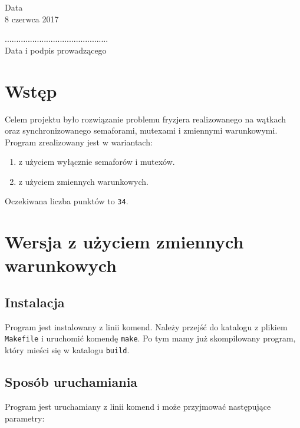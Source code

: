 \documentclass[12pt,a4paper]{article}
\newcommand{\datazajec}{8 czerwca 2017}
\begin{document}
	\begin{minipage}[t]{0.4\linewidth}
		\centering
		Data \\
		\small \datazajec
	\end{minipage}
	
	\begin{flushright}
		\begin{minipage}[t]{0.5\linewidth}
			\centering
			............................................. \\
			\small \textsf{Data i podpis prowadzącego}
		\end{minipage}
	\end{flushright}
	\pagebreak

	\tableofcontents

	\pagebreak

	
	\section{Wstęp}
	Celem projektu było rozwiązanie problemu fryzjera realizowanego na wątkach oraz 
	synchronizowanego semaforami, mutexami i zmiennymi warunkowymi.\\
	Program zrealizowany jest w wariantach:
	\begin{enumerate}[label=\alph*)]
		\item z użyciem wyłącznie semaforów i mutexów.
		\item z użyciem zmiennych warunkowych.
	\end{enumerate}
	Oczekiwana liczba punktów to \texttt{34}.
	
	\section{Wersja z użyciem zmiennych warunkowych}
	\subsection{Instalacja}
	Program jest instalowany z linii komend. Należy przejść do katalogu z plikiem 
	\texttt{Makefile} i uruchomić komendę \texttt{make}. Po tym mamy już skompilowany 
	program, który mieści się w katalogu \texttt{build}.
	
	\subsection{Sposób uruchamiania}
	Program jest uruchamiany z linii komend i może przyjmować następujące parametry:
	
\end{document}
